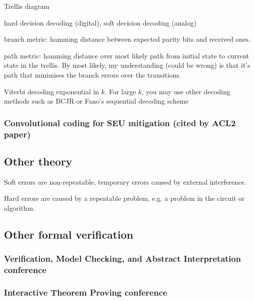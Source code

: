\documentclass{article}
\begin{document}
Trellis diagram

hard decision decoding (digital), soft decision decoding (analog)

branch metric: hamming distance between expected parity bits and received ones.

path metric: hamming distance over most likely path from initial state to current state in the trellis. By most likely, my understanding (could be wrong) is that it's path that minimises the branch errors over the transitions.

Viterbi decoding exponential in $k$. For large $k$, you may use other decoding methods such as BCJR or Fano's sequential decoding scheme

\subsubsection{Convolutional coding for SEU mitigation (cited by ACL2 paper)}



\subsection{Other theory}

Soft errors are non-repeatable, temporary errors caused by external interference.

Hard errors are caused by a repeatable problem, e.g. a problem in the circuit or algorithm.


\subsection{Other formal verification}

\subsubsection{Verification, Model Checking, and Abstract Interpretation conference}

\subsubsection{Interactive Theorem Proving conference}
\end{document}
